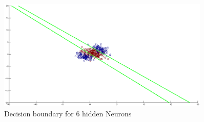 \documentclass[a4paper]{article}
\begin{document}
\begin{itemize}
			\begin{tcolorbox}
				\begin{figure}[H]
					\begin{center}
						\includegraphics[width=0.9\textwidth]{decisionboundary6.eps}
						\caption{ Decision boundary for 6 hidden Neurons }\label{fig:decisionbound-6}
					\end{center}
				\end{figure}
			\end{tcolorbox}
						    
	\end{itemize}
\end{document}
